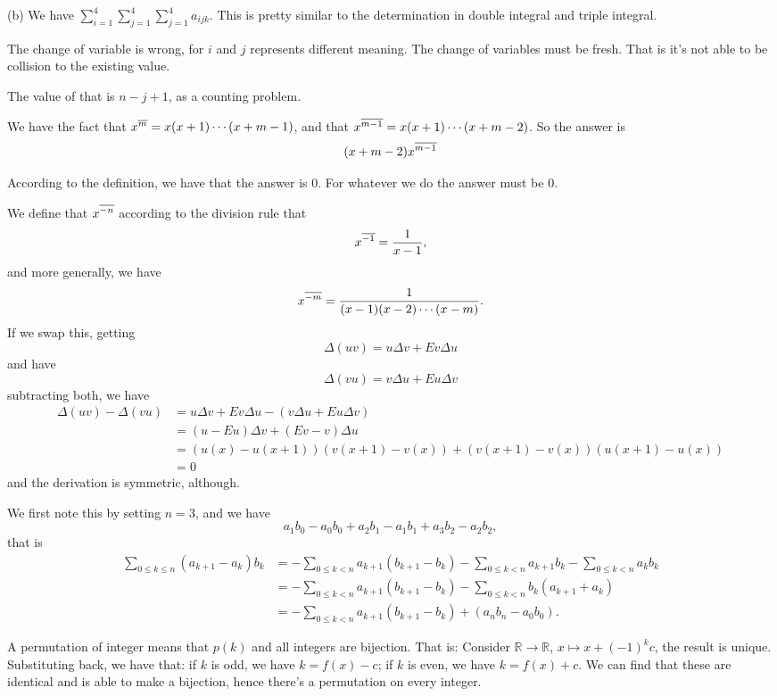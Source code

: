 (b) We have $\sum_{i=1}^{4} \sum_{j=1}^{4} \sum_{j=1}^{4} a_{ijk}.$ This 
is pretty similar to the determination in double integral and triple 
integral. 

 The change of variable is wrong, for $i$ and $j$ represents 
different meaning. The change of variables must be fresh. That is it's 
not able to be collision to the existing value. 

 The value of that is $n-j+1$, as a counting problem. 

 We have the fact that $x^{\overline{m}} = x(x+1)\cdots (x+m-1)$, and that 
$x^{\overline{m-1}} = x(x+1)\cdots (x+m-2)$. So the answer is 
\[
    (x+m-2) x^{\overline{m-1}}
\]

 According to the definition, we have that the answer is 0. 
For whatever we do the answer must be 0. 

 We define that $x^{\overline{-n}}$ according to the division rule that 
\[
    x^{\overline{-1}} = {1\over x-1}, 
\]
and more generally, we have 
\[
    x^{\overline{-m}} = {1\over (x-1)(x-2)\cdots (x-m)}.  
\]
 If we swap this, getting 
\[
    \Delta (uv) = u\Delta v + Ev\Delta u
\]
and have 
\[
    \Delta (vu) = v\Delta u + Eu\Delta v
\]
subtracting both, we have 
\begin{align*}
    \Delta (uv)-\Delta (vu) &= u\Delta v +Ev\Delta u - (v\Delta u + Eu\Delta v) \\
                            &= (u-Eu)\Delta v +(Ev - v)\Delta u\\
                            &= (u(x)-u(x+1))(v(x+1)-v(x))+(v(x+1)-v(x))
                            (u(x+1)-u(x))\\
                            &= 0
\end{align*}
and the derivation is symmetric, although. 

 We first note this by setting $n = 3$, and we have 
\[
    a_1b_0-a_0b_0+a_2b_1-a_1b_1+a_3b_2-a_2b_2,
\]
that is 
\begin{align*}
    \sum_{0\leq k\leq n}^{} (a_{k+1}-a_k)b_k &= 
    -\sum_{0\leq k<n}^{}a_{k+1} (b_{k+1}-b_k)-\sum_{0\leq k<n}^{} a_{k+1}b_k
    -\sum_{0\leq k<n}^{} a_kb_k\\
    &= -\sum_{0\leq k<n}^{}a_{k+1}(b_{k+1}-b_k) - 
      \sum_{0\leq k<n}^{} b_k (a_{k+1} + a_k)\\
    &=  -\sum_{0\leq k<n}^{}a_{k+1}(b_{k+1}-b_k) + (a_n b_n - a_0b_0). 
\end{align*}

 A permutation of integer means that $p(k)$ and all integers 
are bijection. That is: Consider $\mathbb R \to \mathbb R$, $x\mapsto x+(-1)^kc$, the result is 
unique. Substituting back, we have that: if $k$ is odd, we have $k=f(x)-c$; 
if $ k$ is even, we have $k=f(x)+c$. We can find that these are identical
and is able to make a bijection, hence there's a permutation on every
integer. 






